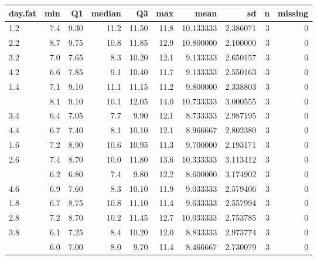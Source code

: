 \documentclass[12pt,]{article}
\begin{document}
\begin{table}[H]
\centering\begingroup\fontsize{8}{10}\selectfont

\begin{tabular}{lrrrrr>{\columncolor[HTML]{EAFAF1}}rrrr}
\toprule
day.fat & min & Q1 & median & Q3 & max & mean & sd & n & missing\\
\midrule
1.2 & 7.4 & 9.30 & 11.2 & 11.50 & 11.8 & 10.133333 & 2.386071 & 3 & 0\\
2.2 & 8.7 & 9.75 & 10.8 & 11.85 & 12.9 & 10.800000 & 2.100000 & 3 & 0\\
3.2 & 7.0 & 7.65 & 8.3 & 10.20 & 12.1 & 9.133333 & 2.650157 & 3 & 0\\
4.2 & 6.6 & 7.85 & 9.1 & 10.40 & 11.7 & 9.133333 & 2.550163 & 3 & 0\\
1.4 & 7.1 & 9.10 & 11.1 & 11.15 & 11.2 & 9.800000 & 2.338803 & 3 & 0\\
\addlinespace
2.4 & 8.1 & 9.10 & 10.1 & 12.05 & 14.0 & 10.733333 & 3.000555 & 3 & 0\\
3.4 & 6.4 & 7.05 & 7.7 & 9.90 & 12.1 & 8.733333 & 2.987195 & 3 & 0\\
4.4 & 6.7 & 7.40 & 8.1 & 10.10 & 12.1 & 8.966667 & 2.802380 & 3 & 0\\
1.6 & 7.2 & 8.90 & 10.6 & 10.95 & 11.3 & 9.700000 & 2.193171 & 3 & 0\\
2.6 & 7.4 & 8.70 & 10.0 & 11.80 & 13.6 & 10.333333 & 3.113412 & 3 & 0\\
\addlinespace
3.6 & 6.2 & 6.80 & 7.4 & 9.80 & 12.2 & 8.600000 & 3.174902 & 3 & 0\\
4.6 & 6.9 & 7.60 & 8.3 & 10.10 & 11.9 & 9.033333 & 2.579406 & 3 & 0\\
1.8 & 6.7 & 8.75 & 10.8 & 11.10 & 11.4 & 9.633333 & 2.557994 & 3 & 0\\
2.8 & 7.2 & 8.70 & 10.2 & 11.45 & 12.7 & 10.033333 & 2.753785 & 3 & 0\\
3.8 & 6.1 & 7.25 & 8.4 & 10.20 & 12.0 & 8.833333 & 2.973774 & 3 & 0\\
\addlinespace
4.8 & 6.0 & 7.00 & 8.0 & 9.70 & 11.4 & 8.466667 & 2.730079 & 3 & 0\\
\bottomrule
\end{tabular}
\endgroup{}
\end{table}
\end{document}
